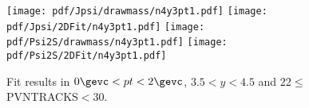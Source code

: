 \begin{figure}[H]
\begin{center}
\texttt{[image: pdf/Jpsi/drawmass/n4y3pt1.pdf]}
\texttt{[image: pdf/Jpsi/2DFit/n4y3pt1.pdf]}
\vspace*{-0.5cm}
\texttt{[image: pdf/Psi2S/drawmass/n4y3pt1.pdf]}
\texttt{[image: pdf/Psi2S/2DFit/n4y3pt1.pdf]}
\vspace*{-0.5cm}
\end{center}
\caption{Fit results in $0\gevc<pt<2\gevc$, $3.5<y<4.5$ and 22$\leq$PVNTRACKS$<$30.}
\label{Fitn4y3pt1}
\end{figure}
